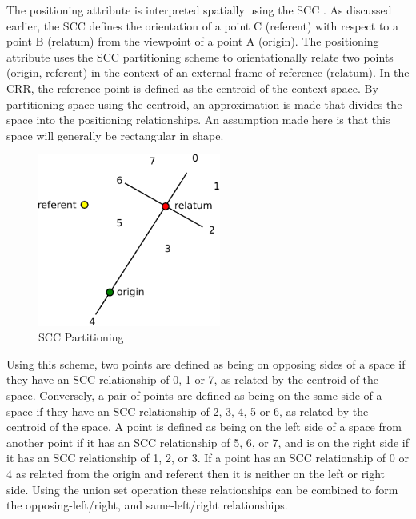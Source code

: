 \documentclass[12pt]{ucthesis}
\begin{document}
The positioning attribute is interpreted spatially using the SCC \cite{Freksa92usingorientation}. As discussed earlier, the SCC defines the orientation of a point C (referent) with respect to a point B (relatum) from the viewpoint of a point A (origin). The positioning attribute uses the SCC partitioning scheme to orientationally relate two points (origin, referent) in the context of an external frame of reference (relatum). In the CRR, the reference point is defined as the centroid of the context space. By partitioning space using the centroid, an approximation is made that divides the space into the positioning relationships. An assumption made here is that this space will generally be rectangular in shape.

\begin{figure}[H]
\centering
\includegraphics[width=60mm]{scc}
\caption{SCC Partitioning}
\label{scc}
\end{figure}

Using this scheme, two points are defined as being on opposing sides of a space if they have an SCC relationship of 0, 1 or 7, as related by the centroid of the space. Conversely, a pair of points are defined as being on the same side of a space if they have an SCC relationship of 2, 3, 4, 5 or 6, as related by the centroid of the  space. A point is defined as being on the left side of a space from another point if it has an SCC relationship of 5, 6, or 7, and is on the right side if it has an SCC relationship of 1, 2, or 3. If a point has an SCC relationship of 0 or 4 as related from the origin and referent then it is neither on the left or right side. Using the union set operation these relationships can be combined to form the opposing-left/right, and same-left/right relationships.
\end{document}
